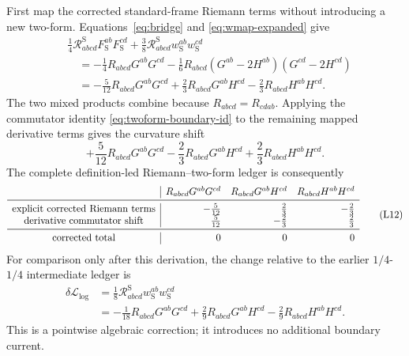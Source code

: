 \documentclass[11pt]{article}
\newcommand{\cL}{\mathcal L}
\newcommand{\cR}{\mathcal R}
\newcommand{\Log}{\log}
\newcommand{\std}{\mathrm S}
\begin{document}
First map the corrected standard-frame Riemann terms without introducing a
new two-form.  Equations~\eqref{eq:bridge} and
\eqref{eq:wmap-expanded} give
\begin{align*}
&\frac14\cR_{abcd}^{\std}F_{\std}^{ab}F_{\std}^{cd}
+\frac38\cR_{abcd}^{\std}w_{\std}^{ab}w_{\std}^{cd}
\nonumber\\
&\quad=-\frac14R_{abcd}G^{ab}G^{cd}
-\frac16R_{abcd}(G^{ab}-2H^{ab})(G^{cd}-2H^{cd})
\nonumber\\
&\quad=-\frac5{12}R_{abcd}G^{ab}G^{cd}
+\frac23R_{abcd}G^{ab}H^{cd}
-\frac23R_{abcd}H^{ab}H^{cd}.
\tag{L10}\label{eq:L-corrected-explicit-Riemann}
\end{align*}
The two mixed products combine because
\(R_{abcd}=R_{cdab}\).  Applying the commutator identity
\eqref{eq:twoform-boundary-id} to the remaining mapped derivative terms gives
the curvature shift
\begin{equation*}
+\frac5{12}R_{abcd}G^{ab}G^{cd}
-\frac23R_{abcd}G^{ab}H^{cd}
+\frac23R_{abcd}H^{ab}H^{cd}.
\tag{L11}\label{eq:L-derivative-Riemann-shift}
\end{equation*}
The complete definition-led Riemann--two-form ledger is consequently
\begin{equation*}
\begin{array}{c|rrr}
&R_{abcd}G^{ab}G^{cd}&R_{abcd}G^{ab}H^{cd}
&R_{abcd}H^{ab}H^{cd}\\
\midrule
\text{explicit corrected Riemann terms}
&-\frac5{12}&\frac23&-\frac23\\
\text{derivative commutator shift}
&\frac5{12}&-\frac23&\frac23\\
\midrule
\text{corrected total}&0&0&0
\end{array}
\tag{L12}\label{eq:L-Riemann-cancellation-ledger}
\end{equation*}
For comparison only after this derivation, the change relative to the earlier
\(1/4\)-\(1/4\) intermediate ledger is
\begin{align*}
\delta\cL_{\Log}
&=\frac18\cR_{abcd}^{\std}w_{\std}^{ab}w_{\std}^{cd}
\nonumber\\
&=-\frac1{18}R_{abcd}G^{ab}G^{cd}
+\frac29R_{abcd}G^{ab}H^{cd}
-\frac29R_{abcd}H^{ab}H^{cd}.
\tag{L13}\label{eq:L-Riemann-correction-map}
\end{align*}
This is a pointwise algebraic correction; it introduces no additional
boundary current.
\end{document}
